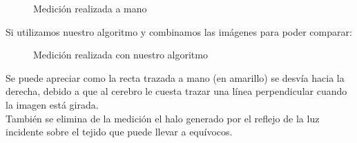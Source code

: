     \begin{figure}[H]
      \caption{Medición realizada a mano}
      \centering \setlength\fboxsep{0pt} \setlength\fboxrule{0.5pt}
    \end{figure}

Si utilizamos nuestro algoritmo y combinamos las imágenes para poder
comparar:

    \begin{figure}[H]
      \caption{Medición realizada con nuestro algoritmo}
      \centering \setlength\fboxsep{0pt} \setlength\fboxrule{0.5pt}
    \end{figure}

Se puede apreciar como la recta trazada a mano (en amarillo) se desvía 
hacia la derecha, debido a que al cerebro le cuesta trazar una línea
perpendicular cuando la imagen está girada.\\
También se elimina de la medición el halo generado por el reflejo de la luz
incidente sobre el tejido que puede llevar a equívocos.

